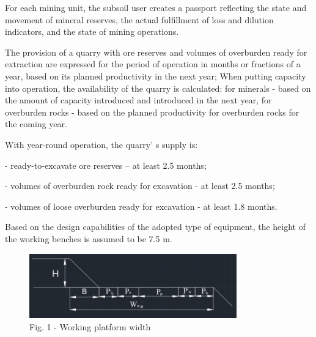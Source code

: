 \begin{multicols}{2}
For each mining unit, the subsoil user creates a passport reflecting the
state and movement of mineral reserves, the actual fulfillment of loss
and dilution indicators, and the state of mining operations.

The provision of a quarry with ore reserves and volumes of overburden
ready for extraction are expressed for the period of operation in months
or fractions of a year, based on its planned productivity in the next
year; When putting capacity into operation, the availability of the
quarry is calculated: for minerals - based on the amount of capacity
introduced and introduced in the next year, for overburden rocks - based
on the planned productivity for overburden rocks for the coming year.

With year-round operation, the quarry' s supply is:

- ready-to-excavate ore reserves -- at least 2.5 months;

- volumes of overburden rock ready for excavation - at least 2.5 months;

- volumes of loose overburden ready for excavation - at least 1.8
months.

Based on the design capabilities of the adopted type of equipment, the
height of the working benches is assumed to be 7.5 m.
\end{multicols}

\begin{figure}[H]
	\centering
	\includegraphics[width=0.8\textwidth]{media/gorn2/image18}
	\caption*{Fig. 1 - Working platform width}
\end{figure}

